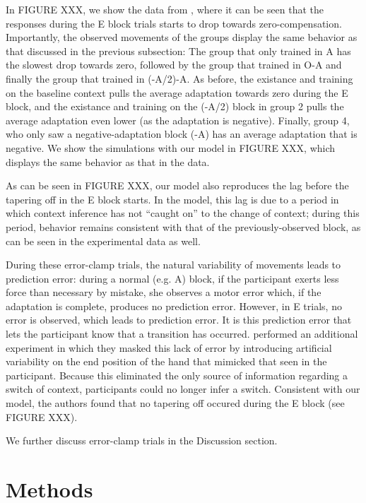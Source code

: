 \documentclass[a4paper,doc,floatsintext,natbib]{apa6}
\begin{document}
In FIGURE XXX, we show the data from \cite{Vaswani_Decay_2013}, where it can be seen that the responses during the E block trials starts to drop towards zero-compensation. Importantly, the observed movements of the groups display the same behavior as that discussed in the previous subsection: The group that only trained in A has the slowest drop towards zero, followed by the group that trained in O-A and finally the group that trained in (-A/2)-A. As before, the existance and training on the baseline context pulls the average adaptation towards zero during the E block, and the existance and training on the (-A/2) block in group 2 pulls the average adaptation even lower (as the adaptation is negative). Finally, group 4, who only saw a negative-adaptation block (-A) has an average adaptation that is negative. We show the simulations with our model in FIGURE XXX, which displays the same behavior as that in the data.

As can be seen in FIGURE XXX, our model also reproduces the lag before the tapering off in the E block starts. In the model, this lag is due to a period in which context inference has not ``caught on'' to the change of context; during this period, behavior remains consistent with that of the previously-observed block, as can be seen in the experimental data as well.

During these error-clamp trials, the natural variability of movements leads to prediction error: during a normal (e.g. A) block, if the participant exerts less force than necessary by mistake, she observes a motor error which, if the adaptation is complete, produces no prediction error. However, in E trials, no error is observed, which leads to prediction error. It is this prediction error that lets the participant know that a transition has occurred. \cite{Vaswani_Decay_2013} performed an additional experiment in which they masked this lack of error by introducing artificial variability on the end position of the hand that mimicked that seen in the participant. Because this eliminated the only source of information regarding a switch of context, participants could no longer infer a switch. Consistent with our model, the authors found that no tapering off occured during the E block (see FIGURE XXX).

We further discuss error-clamp trials in the Discussion section.


\section{Methods}
\end{document}
